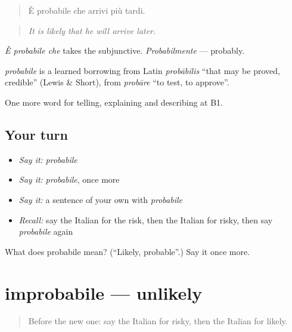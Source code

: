 \begin{quote}
È probabile che arrivi più tardi.
\end{quote}

\begin{quote}
\emph{It is likely that he will arrive later.}
\end{quote}

\emph{È probabile che} takes the subjunctive. \emph{Probabilmente} — probably.

\begin{cousinweb}
\emph{probabile} is a learned borrowing from Latin \emph{probābilis} \textquotedblleft{}that may be proved, credible\textquotedblright{} (Lewis \& Short), from \emph{probāre} \textquotedblleft{}to test, to approve\textquotedblright{}.
\end{cousinweb}

\begin{grammarlens}[title={What you've built}]
One more word for telling, explaining and describing at B1.
\end{grammarlens}

\subsection*{Your turn}
\begin{itemize}
\raggedright
  \item \emph{Say it:} \emph{probabile}
  \item \emph{Say it:} \emph{probabile}, once more
  \item \emph{Say it:} a sentence of your own with \emph{probabile}
  \item \emph{Recall:} say the Italian for the risk, then the Italian for risky, then say \emph{probabile} again
\end{itemize}

\begin{tcolorbox}[breakable,colback=teal!4,colframe=teal!35!black,title={Before you move on}]
What does probabile mean? (\textquotedblleft{}Likely, probable\textquotedblright{}.) Say it once more.
\end{tcolorbox}
\section[improbabile]{improbabile — unlikely}

\label{lesson:IT-C376-improbabile}



\begin{quote}
Before the new one: say the Italian for risky, then the Italian for likely.
\end{quote}

